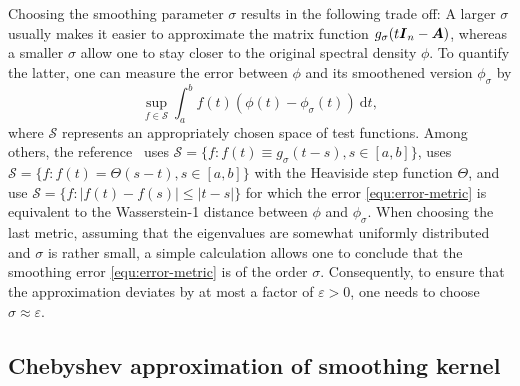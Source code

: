 Choosing the smoothing parameter $\sigma$ results in the following trade off: A larger $\sigma$ usually makes it  easier to approximate the matrix function $g_{\sigma}(t\boldsymbol{I}_n - \boldsymbol{A})$, whereas a smaller $\sigma$ allow one to stay closer to the original spectral density $\phi$. To quantify the latter, one can measure the error between $\phi$ and its smoothened version $\phi_{\sigma}$ by
\begin{equation}
    \sup_{f \in \mathcal{S}} \int_{a}^{b} f(t) (\phi(t) - \phi_{\sigma}(t))~\mathrm{d}t,
    \label{equ:error-metric}
\end{equation}
where $\mathcal{S}$ represents an appropriately chosen space of test functions. Among others, the reference~\cite{lin-2016-approximating-spectral} uses $\mathcal{S} = \{ f: f(t) \equiv g_{\sigma}(t - s), s \in [a, b]\}$, \cite{chen-2021-analysis-stochastic} uses $\mathcal{S} = \{f : f(t) = \Theta(s - t), s \in [a, b] \}$ with the Heaviside step function $\Theta$, and \cite{braverman-2022-sublinear-time,bhattacharjee-2025-improved-spectral} use $\mathcal{S} = \{f : |f(t) - f(s)| \leq |t - s| \}$ for which the error \cref{equ:error-metric} is equivalent to the Wasserstein-1 distance between $\phi$ and $\phi_{\sigma}$.
When choosing 
the last metric,
assuming that the eigenvalues are somewhat uniformly distributed and $\sigma$ is rather small, a simple calculation allows one to conclude that the smoothing error \cref{equ:error-metric} is of the order $\sigma$. Consequently, to ensure that the approximation deviates by at most a factor of $\varepsilon > 0$, one needs to choose $\sigma \approx \varepsilon$.

\subsection{Chebyshev approximation of smoothing kernel}
\label{subsec:chebyshev-approximation}

